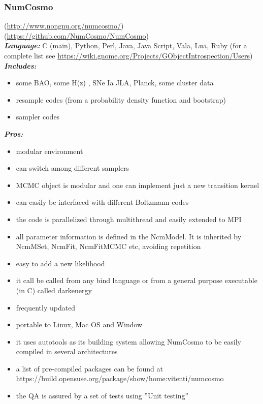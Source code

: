 \newpage
\subsubsection{NumCosmo}

(\url{http://www.nongnu.org/numcosmo/})\\
(\url{https://github.com/NumCosmo/NumCosmo}) \\

{\it \bf Language:} C (main), Python, Perl, Java, Java Script, Vala, Lua, Ruby (for a complete list see \url{https://wiki.gnome.org/Projects/GObjectIntrospection/Users})
\\

{\it \bf Includes:}
\begin{itemize}
 \item some BAO, some H(z) , SNe Ia JLA,  Planck, some cluster data
\item resample codes (from a probability density function and  bootstrap)
\item sampler codes
\end{itemize}

{\it \bf Pros:} 
\begin{itemize}
 \item modular environment
 \item	can switch among different samplers
 \item MCMC object is modular and one can implement just a new transition kernel
\item 	can easily be interfaced with different Boltzmann codes
\item 	the code is parallelized through multithread and easily extended to MPI
\item 	all parameter information is defined in the NcmModel. It is inherited by NcmMSet, NcmFit, NcmFitMCMC etc, avoiding repetition
\item 	easy to add a new likelihood
\item 	it call be called from any bind language or from a general purpose executable (in C) called darkenergy
\item 	frequently updated
\item 	portable to Linux, Mac OS and Window
\item 	it uses autotools as its building system allowing NumCosmo to be easily compiled in several architectures
\item 	a list of pre-compiled packages can be found at https://build.opensuse.org/package/show/home:vitenti/numcosmo
\item 	the QA is assured by a set of tests using ''Unit testing''

 \end{itemize}

